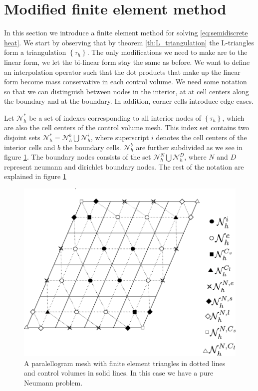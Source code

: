 \documentclass[../Main/main.tex]{subfiles}
\begin{document}
	\section*{Modified finite element method}
	In this section we introduce a finite element method for solving \eqref{eq:semidiscrete heat}. We start by observing that by theorem \ref{th:L_triangulation} the L-triangles form a triangulation $\left \{ \tau_h \right \}$. The only modifications we need to make are to the linear form, we let the bi-linear form stay the same as before. We want to define an interpolation operator such that the dot products that make up the linear form become mass conservative in each control volume. We need some notation so that we can distinguish between nodes in the interior, at at cell centers along the boundary and at the boundary. In addition, corner cells introduce edge cases. 
	\par 
	Let $\mathcal{N}_h^*$ be a set of indexes corresponding to all interior nodes of $\left \{ \tau_h \right \}$, which are also the cell centers of the control volume mesh. This index set contains two disjoint sets $\mathcal{N}_h^* = \mathcal{N}_h^b \bigcup \mathcal{N}_h^i$, where superscript $i$ denotes the cell centers of the interior cells and $b$ the boundary cells. $\mathcal{N}^b_h$ are further subdivided as we see in figure \ref{fig:mesWithNodes}. The boundary nodes consists of the set $\mathcal{N}_h^N \bigcup \mathcal{N}_h^D$, where $N$ and $D$ represent neumann and dirichlet boundary nodes. The rest of the notation are explained in figure \ref{fig:mesWithNodes}
	\begin{figure}[H]
		\centering
		\includegraphics{meshWithNodes.pdf}

		\caption{A paralellogram mesh with finite element triangles in dotted lines and control volumes in solid lines. In this case we have a pure Neumann problem.}
		\label{fig:mesWithNodes}
	\end{figure}
\end{document}
